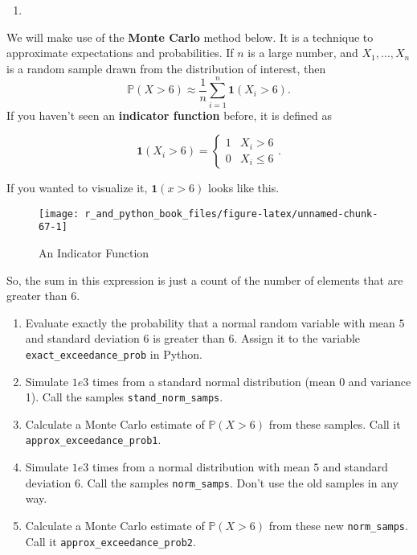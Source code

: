\documentclass[12pt,krantz2]{krantz}
\begin{document}
\begin{enumerate}
\def\labelenumi{\arabic{enumi}.}
\setcounter{enumi}{5}
\item
\end{enumerate}

We will make use of the \textbf{Monte Carlo} method below. It is a technique to approximate expectations and probabilities. If \(n\) is a large number, and \(X_1, \ldots, X_n\) is a random sample drawn from the distribution of interest, then
\begin{equation} 
\mathbb{P}(X > 6) \approx \frac{1}{n}\sum_{i=1}^n \mathbf{1}(X_i > 6).
\end{equation}
If you haven't seen an \textbf{indicator function} before, it is defined as

\begin{equation} 
\mathbf{1}(X_i > 6)
=
\begin{cases}
1 & X_i > 6 \\
0 & X_i \le 6
\end{cases}.
\end{equation}

If you wanted to visualize it, \(\mathbf{1}(x > 6)\) looks like this.

\begin{figure}

{\centering \texttt{[image: r\_and\_python\_book\_files/figure-latex/unnamed-chunk-67-1]} 

}

\caption{An Indicator Function}\label{fig:unnamed-chunk-67}
\end{figure}

So, the sum in this expression is just a count of the number of elements that are greater than \(6\).

\begin{enumerate}
\def\labelenumi{\alph{enumi})}
\item
  Evaluate exactly the probability that a normal random variable with mean \(5\) and standard deviation \(6\) is greater than \(6\). Assign it to the variable \texttt{exact\_exceedance\_prob} in Python.
\item
  Simulate \(1e3\) times from a standard normal distribution (mean 0 and variance 1). Call the samples \texttt{stand\_norm\_samps}.
\item
  Calculate a Monte Carlo estimate of \(\mathbb{P}(X > 6)\) from these samples. Call it \texttt{approx\_exceedance\_prob1}.
\item
  Simulate \(1e3\) times from a normal distribution with mean \(5\) and standard deviation \(6\). Call the samples \texttt{norm\_samps}. Don't use the old samples in any way.
\item
  Calculate a Monte Carlo estimate of \(\mathbb{P}(X > 6)\) from these new \texttt{norm\_samps}. Call it \texttt{approx\_exceedance\_prob2}.
\end{enumerate}
\end{document}
